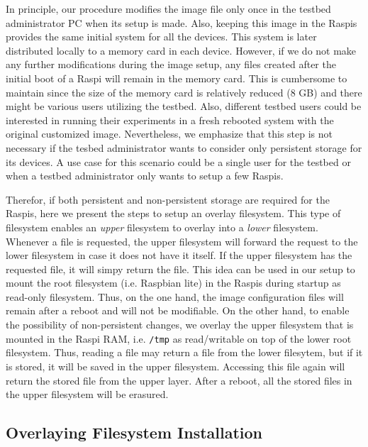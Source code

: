 \label{sec:ovelay_fs}
In principle, our procedure modifies the image file only once in
the testbed administrator \ac{PC} when its setup is made. Also, keeping
this image in the \ac{Raspi}s provides the same initial system for all
the devices. This system is later distributed locally to a memory card
in each device. However, if we do not make any further modifications during
the image setup, any files created after the initial boot of a \ac{Raspi}
will remain in the memory card. This is cumbersome to maintain since
the size of the memory card is relatively reduced (8 GB) and there
might be various users utilizing the testbed. Also, different testbed
users could be interested in running their experiments in a fresh
rebooted system with the original customized image. Nevertheless, we
emphasize that this step is not necessary if the tesbed administrator
wants to consider only persistent storage for its devices. A use case
for this scenario could be a single user for the testbed or when a testbed
administrator only wants to setup a few \ac{Raspi}s.

Therefor, if both persistent and non-persistent storage are required for
the \ac{Raspi}s, here we present the steps to setup an overlay filesystem.
This type of filesystem enables an \textit{upper} filesystem to overlay
into a \textit{lower} filesystem. Whenever a file is requested, the upper
filesystem will forward the request to the lower filesystem in case it
does not have it itself. If the upper filesystem has the requested file,
it will simpy return the file. This idea can be used in our setup to mount
the root filesystem (i.e. Raspbian lite) in the \ac{Raspi}s during startup
as read-only filesystem. Thus, on the one hand, the image configuration files
will remain after a reboot and will not be modifiable. On the other hand,
to enable the possibility of non-persistent changes, we overlay the upper
filesystem that is mounted in the \ac{Raspi} \ac{RAM}, i.e. \texttt{/tmp}
as read/writable on top of the lower root filesystem. Thus, reading a file
may return a file from the lower filesytem, but if it is stored, it will
be saved in the upper filesystem. Accessing this file again will return
the stored file from the upper layer. After a reboot, all the stored files
in the upper filesystem will be erasured.

\subsection{Overlaying Filesystem Installation}

